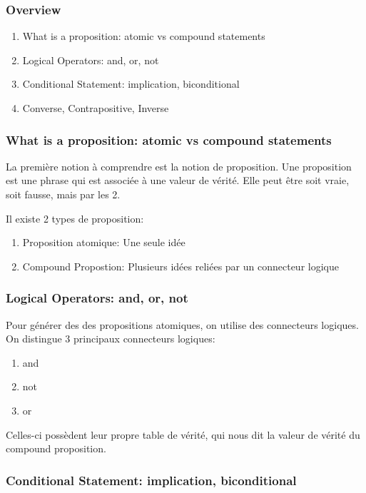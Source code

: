 \documentclass{article}
\begin{document}
\subsubsection{Overview}

\begin{enumerate}
    \item What is a proposition: atomic vs compound statements
    \item Logical Operators: and, or, not
    \item Conditional Statement: implication, biconditional
    \item Converse, Contrapositive, Inverse
\end{enumerate}

\subsubsection{What is a proposition: atomic vs compound statements}

La première notion à comprendre est la notion de proposition. Une
proposition est une phrase qui est associée à une valeur de vérité.
Elle peut être soit vraie, soit fausse, mais par les 2.

Il existe 2 types de proposition:
\begin{enumerate}
    \item Proposition atomique: Une seule idée
    \item Compound Propostion: Plusieurs idées reliées par un connecteur
	logique
\end{enumerate}

\subsubsection{Logical Operators: and, or, not}

Pour générer des des propositions atomiques, on utilise des connecteurs
logiques. On distingue 3 principaux connecteurs logiques:
\begin{enumerate}
    \item and
    \item not
    \item or
\end{enumerate}

Celles-ci possèdent leur propre table de vérité, qui nous dit la valeur
de vérité du compound proposition.

\subsubsection{Conditional Statement: implication, biconditional}
\end{document}
